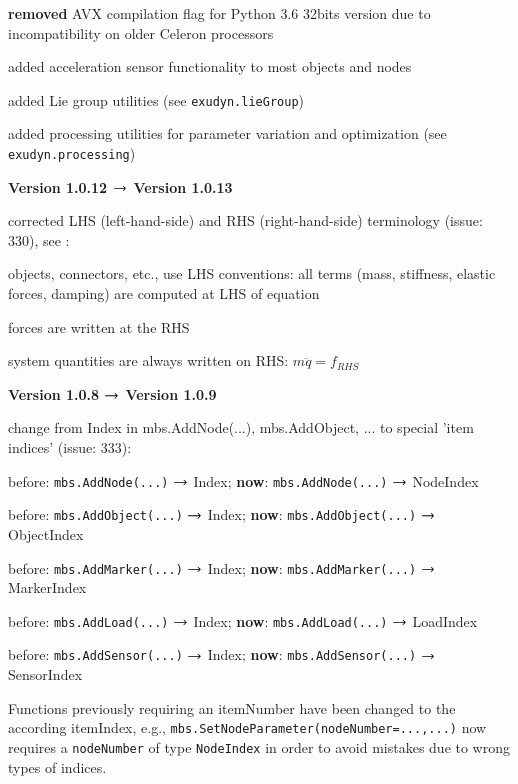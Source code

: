 	\bi
	\item {\bf removed} AVX compilation flag for Python 3.6 32bits version due to incompatibility on older Celeron processors
	\item added acceleration sensor functionality to most objects and nodes
	\item added Lie group utilities (see \texttt{exudyn.lieGroup})
	\item added processing utilities for parameter variation and optimization (see \texttt{exudyn.processing})
	\ei
	\item {\bf Version 1.0.12 $\rightarrow$ Version 1.0.13}
	\item[] corrected LHS (left-hand-side) and RHS (right-hand-side) terminology (issue: 330), see :
	\bi
	  \item objects, connectors, etc., use LHS conventions: all terms (mass, stiffness, elastic forces, damping) are computed at LHS of equation
		\item forces are written at the RHS
		\item system quantities are always written on RHS: $m \ddot q = f_{RHS}$
	\ei
	\item {\bf Version 1.0.8 $\rightarrow$ Version 1.0.9}
	\item[] change from Index in mbs.AddNode(...), mbs.AddObject, ... to special 'item indices' (issue: 333):
	\bi %
	\item before: \texttt{mbs.AddNode(...)} $\rightarrow$ Index; {\bf now}: \texttt{mbs.AddNode(...)} $\rightarrow$ NodeIndex
	\item before: \texttt{mbs.AddObject(...)} $\rightarrow$ Index; {\bf now}: \texttt{mbs.AddObject(...)} $\rightarrow$ ObjectIndex
	\item before: \texttt{mbs.AddMarker(...)} $\rightarrow$ Index; {\bf now}: \texttt{mbs.AddMarker(...)} $\rightarrow$ MarkerIndex
	\item before: \texttt{mbs.AddLoad(...)} $\rightarrow$ Index; {\bf now}: \texttt{mbs.AddLoad(...)} $\rightarrow$ LoadIndex
	\item before: \texttt{mbs.AddSensor(...)} $\rightarrow$ Index; {\bf now}: \texttt{mbs.AddSensor(...)} $\rightarrow$ SensorIndex
	\item Functions previously requiring an itemNumber have been changed to the according itemIndex, e.g., 
		\texttt{mbs.SetNodeParameter(nodeNumber=...,...)} now requires a \texttt{nodeNumber} of type \texttt{NodeIndex} in order
		to avoid mistakes due to wrong types of indices.
